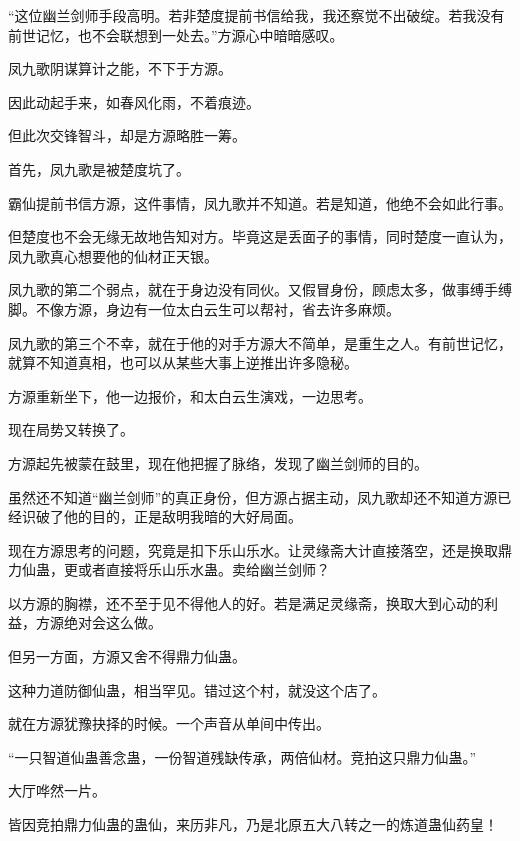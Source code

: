 
\begin{this_body}



“这位幽兰剑师手段高明。若非楚度提前书信给我，我还察觉不出破绽。若我没有前世记忆，也不会联想到一处去。”方源心中暗暗感叹。

凤九歌阴谋算计之能，不下于方源。

因此动起手来，如春风化雨，不着痕迹。

但此次交锋智斗，却是方源略胜一筹。

首先，凤九歌是被楚度坑了。

霸仙提前书信方源，这件事情，凤九歌并不知道。若是知道，他绝不会如此行事。

但楚度也不会无缘无故地告知对方。毕竟这是丢面子的事情，同时楚度一直认为，凤九歌真心想要他的仙材正天银。

凤九歌的第二个弱点，就在于身边没有同伙。又假冒身份，顾虑太多，做事缚手缚脚。不像方源，身边有一位太白云生可以帮衬，省去许多麻烦。

凤九歌的第三个不幸，就在于他的对手方源大不简单，是重生之人。有前世记忆，就算不知道真相，也可以从某些大事上逆推出许多隐秘。

方源重新坐下，他一边报价，和太白云生演戏，一边思考。

现在局势又转换了。

方源起先被蒙在鼓里，现在他把握了脉络，发现了幽兰剑师的目的。

虽然还不知道“幽兰剑师”的真正身份，但方源占据主动，凤九歌却还不知道方源已经识破了他的目的，正是敌明我暗的大好局面。

现在方源思考的问题，究竟是扣下乐山乐水。让灵缘斋大计直接落空，还是换取鼎力仙蛊，更或者直接将乐山乐水蛊。卖给幽兰剑师？

以方源的胸襟，还不至于见不得他人的好。若是满足灵缘斋，换取大到心动的利益，方源绝对会这么做。

但另一方面，方源又舍不得鼎力仙蛊。

这种力道防御仙蛊，相当罕见。错过这个村，就没这个店了。

就在方源犹豫抉择的时候。一个声音从单间中传出。

“一只智道仙蛊善念蛊，一份智道残缺传承，两倍仙材。竞拍这只鼎力仙蛊。”

大厅哗然一片。

皆因竞拍鼎力仙蛊的蛊仙，来历非凡，乃是北原五大八转之一的炼道蛊仙药皇！


\end{this_body}
